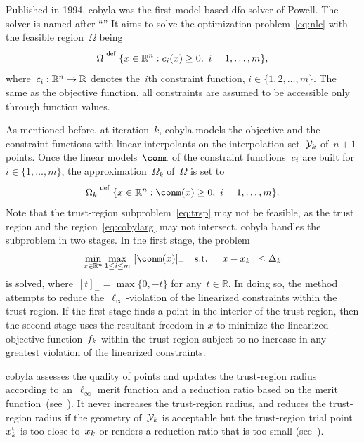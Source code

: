 \documentclass[
    smallextended,  %
    final,          %
]{svjour3}
\newcommand{\R}{\mathbb{R}}
\newcommand{\con}[1][i]{c\ifthenelse{\equal{#1}{}}{}{_{#1}}}
\newcommand{\eqdef}{\mathrel{\stackrel{\mathsf{def}}{=}}}
\newcommand{\fsetm}[1][k]{\Omega_{#1}}
\newcommand{\fset}{\Omega}
\newcommand{\iter}[1][k]{x\ifthenelse{\equal{#1}{}}{}{_{#1}}}
\newcommand{\norm}[2][]{#1\lVert#2#1\rVert}
\newcommand{\objm}[1][k]{\obj\ifthenelse{\equal{#1}{}}{}{_{#1}}}
\newcommand{\obj}{f}
\newcommand{\rad}[1][k]{\Delta\ifthenelse{\equal{#1}{}}{}{_{#1}}}
\newcommand{\set}[2][]{#1\{#2#1\}}
\newcommand{\st}{\text{s.t.}}
\newcommand{\trust}{{\text{t}}}
\newcommand{\xpt}[1][k]{\mathcal{Y}\ifthenelse{\equal{#1}{}}{}{_{#1}}}
\begin{document}
Published in 1994, \gls{cobyla} was the first model-based \gls{dfo} solver of Powell.
The solver is named after ``.''
It aims to solve the optimization problem~\eqref{eq:nlc} with the feasible region~$\fset$ being
\begin{equation*}
    \fset \eqdef \set{x \in \R^n : \con(x) \ge 0, ~ i = 1, \dots, m},
\end{equation*}
where~$\con : \R^n \to \R$ denotes the~$i$th constraint function, $i \in \set{1, 2, \dots, m}$.
The same as the objective function, all constraints are assumed to be accessible only through function values.

As mentioned before, at iteration~$k$, \gls{cobyla} models the objective and the constraint functions with {linear}
interpolants on the interpolation set~$\xpt$ of~$n + 1$ points.
Once the linear models~$\conm$ of the constraint functions~$\con$ are built for~$i \in \set{1, \dots, m}$, the approximation~$\fsetm$ of~$\fset$ is set to
\begin{equation}
    \label{eq:cobylarg}
    \fsetm \eqdef \set{x \in \R^n : \conm(x) \ge 0, ~ i=1, \dots, m}.
\end{equation}
Note that the trust-region subproblem~\eqref{eq:trsp} may not be feasible,
as the trust region and the region~\eqref{eq:cobylarg} may not intersect.
\gls{cobyla} handles the subproblem in two stages. In the first stage, the problem
\begin{equation*}
    \min_{x \in \R^n}  \max_{1 \le i \le m} ~ [\conm(x)]_{-} \quad \st \quad \norm{x - \iter} \le \rad
\end{equation*}
is solved, where~$[t]_{-} = \max \set{0, -t}$ for any~$t\in \R$.
In doing so, the method attempts to reduce the~$\ell_{\infty}$-violation of the linearized constraints within the trust region.
If the first stage finds a point in the interior of the trust region,
then the second stage uses the resultant freedom in $x$ to minimize the linearized objective
function~$\objm$ within the trust region subject to no increase in any greatest violation of the
linearized constraints.

\gls{cobyla} assesses the quality of points and updates the trust-region radius according to
an~$\ell_\infty$ merit function and a reduction ratio based on the merit
function~(see~\cite[equations~(5),~(9), and~(10)]{Powell_1994}). It never increases
the trust-region radius, and reduces the trust-region radius if the geometry of~$\xpt$ is acceptable
but the trust-region trial point~$\iter^\trust$ is too close to~$\iter$ or renders a reduction ratio
that is too small (see~\cite[equation~(11)]{Powell_1994}).%
\end{document}
